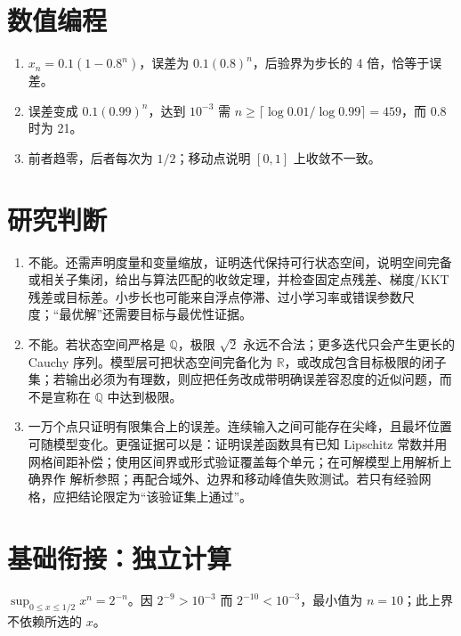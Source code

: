 \section*{数值编程}
\begin{enumerate}[leftmargin=*]
  \item $x_n=0.1(1-0.8^n)$，误差为 $0.1(0.8)^n$，后验界为步长的 4 倍，恰等于误差。
  \item 误差变成 $0.1(0.99)^n$，达到 $10^{-3}$ 需 $n\geq\lceil\log0.01/\log0.99\rceil=459$，而 0.8 时为 21。
  \item 前者趋零，后者每次为 $1/2$；移动点说明 $[0,1]$ 上收敛不一致。
\end{enumerate}

\section*{研究判断}
\begin{enumerate}[leftmargin=*]
  \item 不能。还需声明度量和变量缩放，证明迭代保持可行状态空间，说明空间完备或相关子集闭，给出与算法匹配的收敛定理，并检查固定点残差、梯度/KKT 残差或目标差。小步长也可能来自浮点停滞、过小学习率或错误参数尺度；“最优解”还需要目标与最优性证据。
  \item 不能。若状态空间严格是 $\mathbb Q$，极限 $\sqrt2$ 永远不合法；更多迭代只会产生更长的 Cauchy 序列。模型层可把状态空间完备化为 $\mathbb R$，或改成包含目标极限的闭子集；若输出必须为有理数，则应把任务改成带明确误差容忍度的近似问题，而不是宣称在 $\mathbb Q$ 中达到极限。
  \item 一万个点只证明有限集合上的误差。连续输入之间可能存在尖峰，且最坏位置可随模型变化。更强证据可以是：证明误差函数具有已知 Lipschitz 常数并用网格间距补偿；使用区间界或形式验证覆盖每个单元；在可解模型上用解析上确界作 解析参照；再配合域外、边界和移动峰值失败测试。若只有经验网格，应把结论限定为“该验证集上通过”。
\end{enumerate}

\section*{基础衔接：独立计算}
$\sup_{0\leq x\leq1/2}x^n=2^{-n}$。因 $2^{-9}>10^{-3}$ 而 $2^{-10}<10^{-3}$，最小值为 $n=10$；此上界不依赖所选的 $x$。
